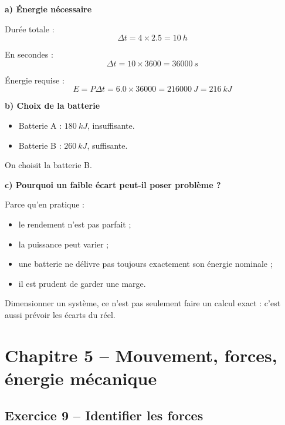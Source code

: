 \documentclass[11pt,a4paper]{article}
\begin{document}
\begin{corrigebox}
\textbf{a) Énergie nécessaire}

Durée totale :
\[
\Delta t = 4\times 2.5 = \SI{10}{h}
\]

En secondes :
\[
\Delta t = 10\times 3600 = \SI{36000}{s}
\]

Énergie requise :
\[
E = P\Delta t = 6.0\times 36000 = \SI{216000}{J} = \SI{216}{kJ}
\]

\textbf{b) Choix de la batterie}

\begin{itemize}
    \item Batterie A : \(\SI{180}{kJ}\), insuffisante.
    \item Batterie B : \(\SI{260}{kJ}\), suffisante.
\end{itemize}

On choisit la batterie B.

\textbf{c) Pourquoi un faible écart peut-il poser problème ?}

Parce qu'en pratique :
\begin{itemize}
    \item le rendement n'est pas parfait ;
    \item la puissance peut varier ;
    \item une batterie ne délivre pas toujours exactement son énergie nominale ;
    \item il est prudent de garder une marge.
\end{itemize}

\begin{bilanbox}
Dimensionner un système, ce n'est pas seulement faire un calcul exact : c'est aussi prévoir les écarts du réel.
\end{bilanbox}
\end{corrigebox}

\section{Chapitre 5 -- Mouvement, forces, énergie mécanique}

\subsection{Exercice 9 -- Identifier les forces}
\end{document}
